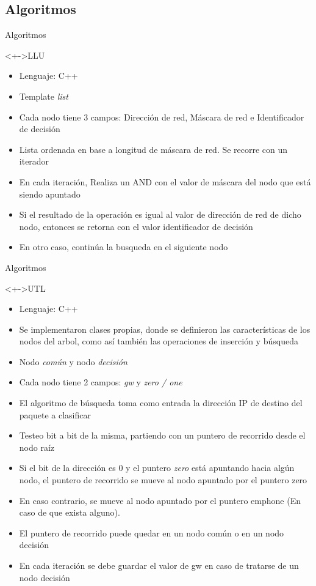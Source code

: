\documentclass[xcolor=dvipsnames]{beamer}
\begin{document}
\subsection{Algoritmos}
\begin{frame}{Algoritmos}
\begin{block}<+->{LLU}   
    \begin{itemize}
      \scriptsize
     	\item Lenguaje: C++
     	\item Template \emph{list}
     	\item Cada nodo tiene 3 campos: Dirección de red, Máscara de red e Identificador de decisión
	\item Lista ordenada en base a longitud de máscara de red. Se recorre con un iterador
	\item En cada iteración, Realiza un AND con el valor de máscara del nodo que está siendo apuntado
	\item Si el resultado de la operación es igual al valor de dirección de red de dicho nodo, entonces se retorna con el valor identificador de decisión
	\item En otro caso, continúa la busqueda en el siguiente nodo
    \end{itemize}
  \end{block}
\end{frame}

\begin{frame}{Algoritmos}
\begin{block}<+->{UTL}   
    \begin{itemize}
      \scriptsize
     	\item Lenguaje: C++
     	\item Se implementaron clases propias, donde se definieron las características de los nodos del arbol, como así también las operaciones de inserción y búsqueda
     	\item Nodo \emph{común} y nodo \emph{decisión}
	\item Cada nodo tiene 2 campos: \emph{gw} y \emph{zero / one}
	\item El algoritmo de búsqueda toma como entrada la dirección IP de destino del paquete a clasificar
	\item Testeo bit a bit de la misma, partiendo con un puntero de recorrido desde el nodo raíz
	\item Si el bit de la dirección es 0 y el puntero \emph{zero} está apuntando hacia algún nodo, el puntero de recorrido se mueve al nodo apuntado por el puntero zero
	\item En caso contrario, se mueve al nodo apuntado por el puntero emph{one} (En caso de que exista alguno).
	\item El puntero de recorrido puede quedar en un nodo común o en un nodo decisión
	\item En cada iteración se debe guardar el valor de gw en caso de tratarse de un nodo decisión
    \end{itemize}
  \end{block}
\end{frame}
\end{document}
